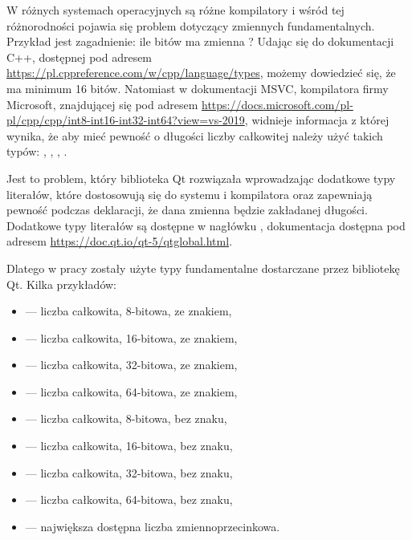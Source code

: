 \par
W różnych systemach operacyjnych są różne kompilatory i wśród tej różnorodności pojawia się problem dotyczący zmiennych fundamentalnych.
Przykład jest zagadnienie: ile bitów ma zmienna ?
Udając się do dokumentacji C++, dostępnej pod adresem \url{https://pl.cppreference.com/w/cpp/language/types}, możemy dowiedzieć się, że  ma minimum 16 bitów.
Natomiast w dokumentacji MSVC, kompilatora firmy Microsoft, znajdującej się pod adresem \url{https://docs.microsoft.com/pl-pl/cpp/cpp/int8-int16-int32-int64?view=vs-2019}, widnieje informacja z której wynika, że aby mieć pewność o długości liczby całkowitej należy użyć takich typów: , , , .
\par
Jest to problem, który biblioteka Qt rozwiązała wprowadzając dodatkowe typy literałów, które dostosowują się do systemu i kompilatora oraz zapewniają pewność podczas deklaracji, że dana zmienna będzie zakładanej długości.
Dodatkowe typy literałów są dostępne w nagłówku , dokumentacja dostępna pod adresem \url{https://doc.qt.io/qt-5/qtglobal.html}.

\par
Dlatego w pracy zostały użyte typy fundamentalne dostarczane przez bibliotekę Qt.
Kilka przykładów:
\begin{itemize}
    \item {} --- liczba całkowita, 8-bitowa, ze znakiem,
    \item {} --- liczba całkowita, 16-bitowa, ze znakiem,
    \item {} --- liczba całkowita, 32-bitowa, ze znakiem,
    \item {} --- liczba całkowita, 64-bitowa, ze znakiem,
    \item {} --- liczba całkowita, 8-bitowa, bez znaku,
    \item {} --- liczba całkowita, 16-bitowa, bez znaku,
    \item {} --- liczba całkowita, 32-bitowa, bez znaku,
    \item {} --- liczba całkowita, 64-bitowa, bez znaku,
    \item {} --- największa dostępna liczba zmiennoprzecinkowa.
\end{itemize}